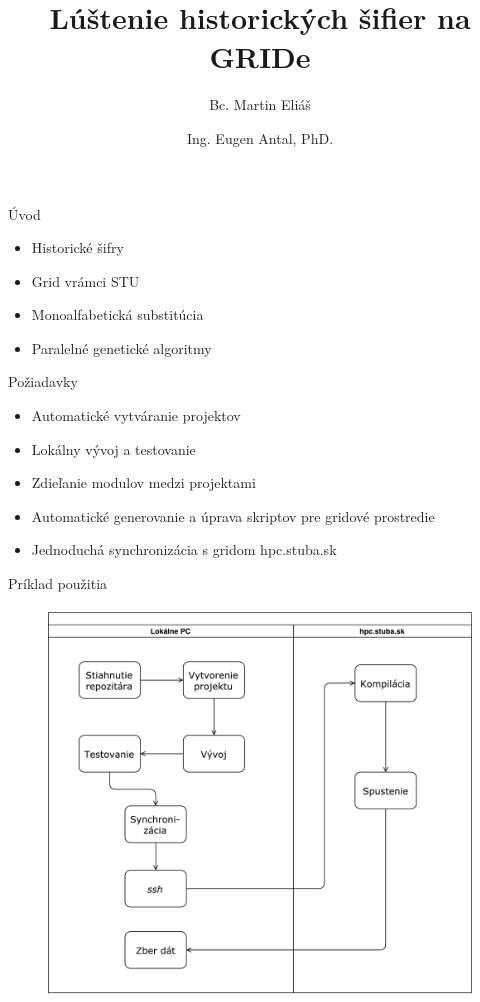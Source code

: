 \documentclass{beamer}
\title{Lúštenie historických šifier na GRIDe}
\author{Bc. Martin Eliáš}
\date{Ing. Eugen Antal, PhD.}
\institute{Slovenská technická univerzita v Bratislave}
\begin{document}
\maketitle

\begin{frame}{Úvod}
  \begin{itemize}
  \item Historické šifry
  \item Grid vrámci STU
  \item Monoalfabetická substitúcia
  \item Paralelné genetické algoritmy
  \end{itemize}
\end{frame}

\begin{frame}{Požiadavky}
  \begin{itemize}
  \item Automatické vytváranie projektov
  \item Lokálny vývoj a testovanie
  \item Zdieľanie modulov medzi projektami
  \item Automatické generovanie a úprava skriptov pre gridové prostredie
  \item Jednoduchá synchronizácia s gridom hpc.stuba.sk
  \end{itemize}
\end{frame}

\begin{frame}{Príklad použitia}
  \begin{figure}
    \includegraphics[scale=0.35]{img/uc.pdf}
  \end{figure}
\end{frame}
\end{document}
